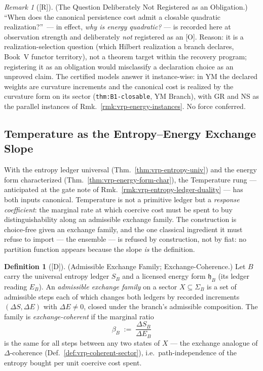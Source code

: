 \documentclass[12pt,oneside]{amsbook}
\theoremstyle{plain}
\theoremstyle{definition}
\newtheorem{definition}[theorem]{Definition}
\theoremstyle{remark}
\newtheorem{remark}[theorem]{Remark}
\newcommand{\status}[1]{\textup{[#1]}}
\begin{document}
\begin{remark}[\status{R}]\label{rmk:vrp-why-quadratic}
\textup{(The Question Deliberately Not Registered as an
Obligation.)}
``When does the canonical persistence cost admit a closable
quadratic realization?''\ --- in effect, \emph{why is energy
quadratic?} --- is recorded here at observation strength and
deliberately \emph{not} registered as an [O].  Reason: it is a
realization-selection question (which Hilbert realization a
branch declares, Book~V functor territory), not a theorem target
within the recovery program; registering it as an obligation
would misclassify a declaration choice as an unproved claim.  The
certified models answer it instance-wise: in YM the declared
weights are curvature increments and the canonical cost is
realized by the curvature form on its sector
(\texttt{thm:B1-closable}, YM Branch), with GR and NS as the
parallel instances of Rmk.~\ref{rmk:vrp-energy-instances}.  No
force conferred.
\end{remark}

\subsection{Temperature as the Entropy--Energy Exchange Slope}
\label{sec:vrp-temperature}

With the entropy ledger universal (Thm.~\ref{thm:vrp-entropy-univ})
and the energy form characterized
(Thm.~\ref{thm:vrp-energy-form-char}), the Temperature rung ---
anticipated at the gate note of
Rmk.~\ref{rmk:vrp-entropy-ledger-duality} --- has both inputs
canonical.  Temperature is not a primitive ledger but a
\emph{response coefficient}: the marginal rate at which coercive
cost must be spent to buy distinguishability along an admissible
exchange family.  The construction is choice-free given an exchange
family, and the one classical ingredient it must refuse to import
--- the ensemble --- is refused by construction, not by fiat: no
partition function appears because the slope \emph{is} the
definition.

\begin{definition}[\status{D}]\label{def:vrp-exchange-family}
\textup{(Admissible Exchange Family; Exchange-Coherence.)}
Let $B$ carry the universal entropy ledger $S_B$ and a licensed
energy form $\mathfrak{h}_B$ (its ledger reading $E_B$).  An
\emph{admissible exchange family} on a sector $X \subseteq
\Sigma_B$ is a set of admissible steps each of which changes both
ledgers by recorded increments $(\Delta S, \Delta E)$ with
$\Delta E \neq 0$, closed under the branch's admissible
composition.  The family is \emph{exchange-coherent} if the
marginal ratio
\[
  \beta_B \;:=\; \frac{\Delta S_B}{\Delta E_B}
\]
is the same for all steps between any two states of $X$ --- the
exchange analogue of $\Delta$-coherence
(Def.~\ref{def:vrp-coherent-sector}), i.e.\ path-independence of
the entropy bought per unit coercive cost spent.
\end{definition}
\end{document}
